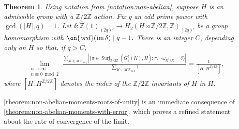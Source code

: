 \documentclass[12 pt]{amsart}
\theoremstyle{plain}
\newtheorem{theorem}[subsubsection]{Theorem}
\theoremstyle{definition}
\theoremstyle{remark}
\numberwithin{equation}{section}
\DeclareMathOperator\im{im}
\DeclareMathOperator\surj{Surj}
\begin{document}
\begin{theorem}
		\label{theorem:non-abelian-moments-roots-of-unity}
	Using notation from \autoref{notation:non-abelian},
	suppose $H$ is an admissible group with a $\mathbb Z/2 \mathbb Z$ action.
	Fix $q$ an odd prime power with 
	$\gcd( |H|, q) = 1$.
Let $\delta: \hat{\mathbb Z}(1)_{(2q)'} \to H_2(H \rtimes \mathbb Z/2 \mathbb Z, \mathbb
Z)_{(2q)'}$ be a group homomorphism with $\on{ord}(\im \delta) \mid q-1.$
There is an integer $C$, depending only on $H$ so that,
if $q > C$,
\begin{equation}
	\begin{aligned}
		\label{equation:non-abelian-moments-with-roots-of-unity}
		\lim_{\substack{n \to \infty \\ n \equiv 0 \bmod 2 }}
		\frac{\sum_{K \in \mathcal{MH}_{n,q}}
		\left| \{ \pi \in \surj_{\mathbb Z/2 \mathbb
			Z}\left(G^\sharp_\emptyset(K), H \right): \pi_* \circ
	\omega_{K^\sharp/K} = \delta \}\right|} {\sum_{K \in \mathcal{MH}_{n,q}} 1} =
	\frac{1}{[H:H^{\mathbb Z/2 \mathbb Z}]},
	\end{aligned}
\end{equation}
where $[H: H^{\mathbb Z/2 \mathbb Z}]$ denotes the index of the $\mathbb Z/2
\mathbb Z$ invariants of $H$ in $H$.
\end{theorem}
\autoref{theorem:non-abelian-moments-roots-of-unity} is an immediate consequence of
\autoref{theorem:non-abelian-moments-with-error}, %
which proves a refined statement about the rate of convergence of the limit.
\end{document}
